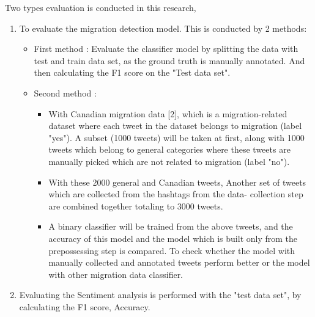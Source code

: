 Two types evaluation is conducted in this research,
\begin{enumerate}
    \item To evaluate the migration detection model. This is conducted by 2 methods:
    \begin{itemize}
        \item First method : 
        Evaluate the classifier model by splitting the data with
        test and train data set, as the ground truth is manually annotated. And then calculating the F1 score on the "Test data set".
        \item Second method :
        \begin{itemize}
            \item With Canadian migration data [2], which is a migration-related dataset where each tweet in the dataset belongs to migration (label "yes"). A subset (1000 tweets) will be taken at first, along
            with 1000 tweets which belong to general categories where these tweets are manually picked which are not related to migration (label "no"). 
            \item With these 2000 general and Canadian tweets, Another set of tweets which are collected from the hashtags from the data- collection step are combined together totaling to 3000 tweets.
            \item A binary classifier will be trained from the above tweets, and the accuracy of this model and the model which is built only from the prepossessing step is compared. To check whether the model with manually collected and annotated tweets perform better or the model with other migration data classifier.
        \end{itemize}
        
    \end{itemize}


    \item Evaluating the Sentiment analysis is performed with the "test data set",
by calculating the F1 score, Accuracy.
\end{enumerate}